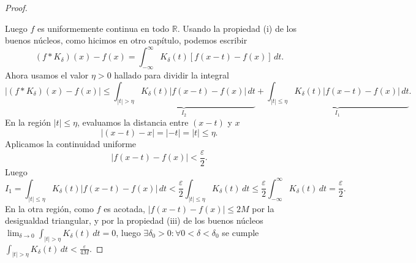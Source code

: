 \documentclass[12pt]{article}
\newcommand{\R}{\mathbb{R}}
\theoremstyle{plain}
\theoremstyle{definition}
\numberwithin{equation}{section}
\begin{document}
\begin{proof}
\begin{itemize}
                \end{itemize}
                Luego \(f\) es uniformemente continua en todo \(\R\).
                Usando la propiedad (i) de los buenos núcleos, como hicimos en otro capítulo, podemos escribir
                \begin{equation*}
                    (f * K_\delta)(x) - f(x) = \int_{-\infty}^{\infty} K_\delta(t) [f(x-t) - f(x)] \,dt.
                \end{equation*}
                Ahora usamos el valor \(\eta > 0\) hallado para dividir la integral
                \begin{equation*}
                    \left\lvert (f * K_\delta)(x) - f(x) \right\rvert \le \underbrace{\int_{\left\lvert t \right\rvert > \eta} K_\delta(t) \left\lvert f(x-t) - f(x) \right\rvert \,dt}_{I_2} + \underbrace{\int_{\left\lvert t \right\rvert \le \eta} K_\delta(t) \left\lvert f(x-t) - f(x) \right\rvert \,dt}_{I_1}.
                \end{equation*}
                En la región \(\left\lvert t \right\rvert \le \eta\), evaluamos la distancia entre \((x-t)\) y \(x\)
                \begin{equation*}
                    \left\lvert (x-t) - x \right\rvert = \left\lvert -t \right\rvert = \left\lvert t \right\rvert \le \eta.
                \end{equation*}
                Aplicamos la continuidad uniforme
                \begin{equation*}
                    \left\lvert f(x-t) - f(x) \right\rvert < \frac{\varepsilon}{2}.
                \end{equation*}
                Luego
                \begin{equation*}
                    I_1 = \int_{\left\lvert t \right\rvert \le \eta} K_\delta(t) \left\lvert f(x-t) - f(x) \right\rvert \,dt < \frac{\varepsilon}{2} \int_{\left\lvert t \right\rvert \le \eta} K_\delta(t) \,dt \le \frac{\varepsilon}{2} \int_{-\infty}^{\infty} K_\delta(t) \,dt = \frac{\varepsilon}{2}.
                \end{equation*}
                En la otra región, como \(f\) es acotada, \(\left\lvert f(x-t) - f(x) \right\rvert \le 2M\) por la desigualdad triangular, y por la propiedad (iii) de los buenos núcleos \(\lim_{\delta \to 0} \int_{\left\lvert t \right\rvert > \eta} K_\delta(t) \,dt = 0\), luego \(\exists \delta_0 > 0 : \forall 0 < \delta < \delta_0\) se cumple \(\int_{\left\lvert t \right\rvert > \eta} K_\delta(t) \,dt < \frac{\varepsilon}{4M}\). 

\end{proof}
\end{document}
